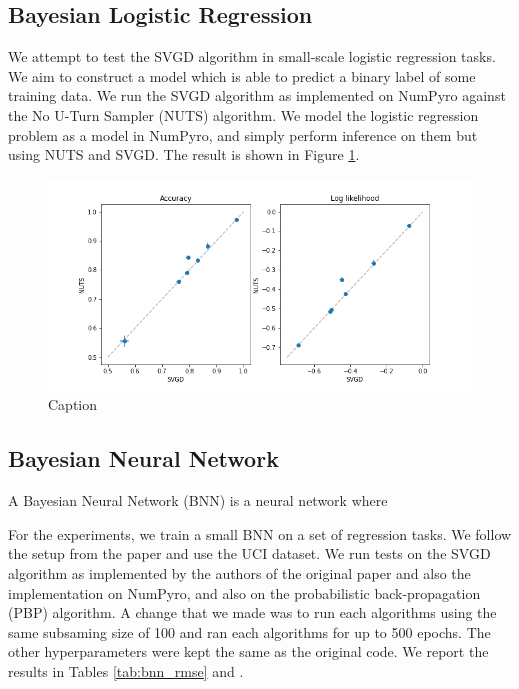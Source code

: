 \subsection{Bayesian Logistic Regression}

We attempt to test the SVGD algorithm in small-scale logistic regression tasks. We aim to construct a model which is able to predict a binary label of some training data. We run the SVGD algorithm as implemented on NumPyro against the No U-Turn Sampler (NUTS) algorithm. We model the logistic regression problem as a model in NumPyro, and simply perform inference on them but using NUTS and SVGD. The result is shown in Figure \ref{fig:logist_small}.



\begin{figure}[h]
    \centering
    \includegraphics[width=\textwidth]{figs/logistic_svgd_nuts.png}
    \caption{Caption}
    \label{fig:logist_small}
\end{figure}

\subsection{Bayesian Neural Network}

A Bayesian Neural Network (BNN) is a neural network where 

For the experiments, we train a small BNN on a set of regression tasks. We follow the setup from the paper and use the UCI dataset. We run tests on the SVGD algorithm as implemented by the authors of the original paper and also the implementation on NumPyro, and also on the probabilistic back-propagation (PBP) algorithm. A change that we made was to run each algorithms using the same subsaming size of 100 and ran each algorithms for up to 500 epochs. The other hyperparameters were kept the same as the original code. We report the results in Tables \ref{tab:bnn_rmse} and . 

